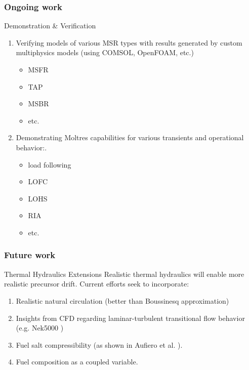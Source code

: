 \begin{frame}
  \frametitle{Ongoing work}       
              \begin{block}{Demonstration \& Verification}
               \begin{enumerate}
                \item Verifying models of various \gls{MSR} types with results 
                        generated by custom multiphysics models (using COMSOL, 
                               OpenFOAM, etc.)
                        \begin{itemize}
                               \item \acrlong{MSFR}
                               \item \acrlong{TAP}
                               \item \acrlong{MSBR}
                               \item etc.
                        \end{itemize}
                \item Demonstrating Moltres capabilities for various transients 
                        and operational behavior:.
                        \begin{itemize}
                                \item load following
                               \item \acrlong{LOFC}
                               \item \acrlong{LOHS}
                               \item \acrlong{RIA}
                               \item etc.
                        \end{itemize}
               \end{enumerate}
               \end{block}
\end{frame}

\begin{frame}
  \frametitle{Future work}       
              \begin{block}{Thermal Hydraulics Extensions}
               Realistic thermal hydraulics will enable more realistic 
                      precursor drift.  Current efforts seek to incorporate:
               \begin{enumerate}
                \item Realistic natural circulation (better than Boussinesq approximation)
                \item Insights from \gls{CFD}
                        regarding laminar-turbulent transitional flow behavior  
                               (e.g. Nek5000 \cite{obabko_verification_2015}) 
               \item Fuel salt compressibility (as shown in Aufiero et 
                               al. \cite{aufiero_monte_2017}).
               \item Fuel composition as a coupled variable.
               \end{enumerate}
               \end{block}
\end{frame}
